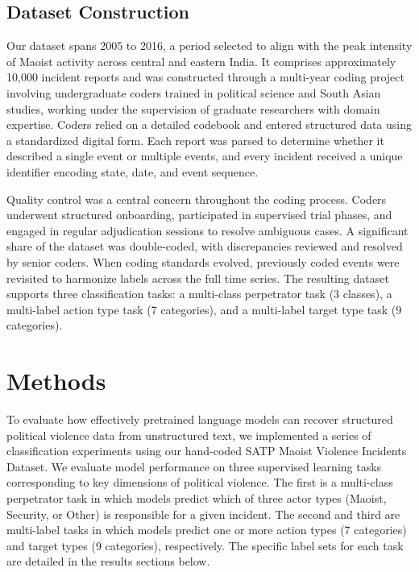 \documentclass[
  11pt,
]{article}
\begin{document}
\subsection{Dataset Construction}\label{dataset-construction}

Our dataset spans 2005 to 2016, a period selected to align with the peak
intensity of Maoist activity across central and eastern India. It
comprises approximately 10,000 incident reports and was constructed
through a multi-year coding project involving undergraduate coders
trained in political science and South Asian studies, working under the
supervision of graduate researchers with domain expertise. Coders relied
on a detailed codebook and entered structured data using a standardized
digital form. Each report was parsed to determine whether it described a
single event or multiple events, and every incident received a unique
identifier encoding state, date, and event sequence.

Quality control was a central concern throughout the coding process.
Coders underwent structured onboarding, participated in supervised trial
phases, and engaged in regular adjudication sessions to resolve
ambiguous cases. A significant share of the dataset was double-coded,
with discrepancies reviewed and resolved by senior coders. When coding
standards evolved, previously coded events were revisited to harmonize
labels across the full time series. The resulting dataset supports three
classification tasks: a multi-class perpetrator task (3 classes), a
multi-label action type task (7 categories), and a multi-label target
type task (9 categories).

\section{Methods}\label{methods}

To evaluate how effectively pretrained language models can recover
structured political violence data from unstructured text, we
implemented a series of classification experiments using our hand-coded
SATP Maoist Violence Incidents Dataset. We evaluate model performance on
three supervised learning tasks corresponding to key dimensions of
political violence. The first is a multi-class perpetrator task in which
models predict which of three actor types (Maoist, Security, or Other)
is responsible for a given incident. The second and third are
multi-label tasks in which models predict one or more action types (7
categories) and target types (9 categories), respectively. The specific
label sets for each task are detailed in the results sections below.
\end{document}
